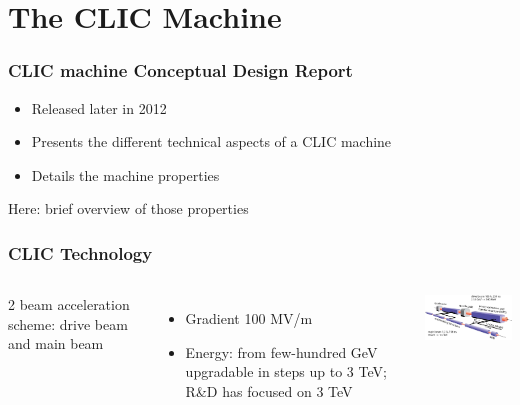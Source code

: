 \documentclass{beamer}
\begin{document}
\section[CLIC]{The CLIC Machine}
\begin{frame}
\frametitle{CLIC machine Conceptual Design Report}
\begin{itemize}
  \item Released later in 2012
  \item Presents the different technical aspects of a CLIC machine
  \item Details the machine properties
\end{itemize}
Here: brief overview of those properties
\end{frame}
\begin{frame}
\frametitle{CLIC Technology}
\begin{columns}[c]
\column{6cm}
2 beam acceleration scheme: drive beam and main beam
\begin{itemize}
  \item Gradient 100 MV/m
  \item Energy: from few-hundred GeV upgradable in steps up to 3 TeV; R\&D has
  focused on 3 TeV
\end{itemize}
\column{6cm}
\includegraphics[width=6cm]{clicacceleration.png}
\end{columns}
\end{frame}
\end{document}
